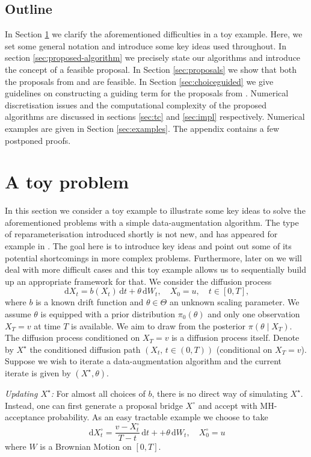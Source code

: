 \documentclass[preprint]{imsart}
\renewcommand{\th}{\theta}
\theoremstyle{definition}
\newcommand{\dd}{{\,\mathrm d}}
\begin{document}
\subsection{Outline}
In Section \ref{sec:toyproblem} we clarify the aforementioned difficulties in a toy example. Here, we set some general notation and  introduce some key ideas used throughout. In  section \ref{sec:proposed-algorithm}  we precisely state our algorithms and introduce the concept of a feasible proposal. 
 In Section \ref{sec:proposals} we show that both the proposals from \cite{DelyonHu} and \cite{Schauer} are feasible.   In Section \ref{sec:choiceguided} we give guidelines on constructing a guiding term  for the proposals from \cite{Schauer}. Numerical discretisation issues and  the computational complexity of the proposed algorithms are discussed in sections \ref{sec:tc} and  \ref{sec:impl} respectively. 
 Numerical examples are given in  Section \ref{sec:examples}. The appendix contains  a few postponed proofs.



\section{A toy problem}\label{sec:toyproblem} 
In this section we consider a toy example to illustrate some key ideas to solve the aforementioned problems with a simple data-augmentation algorithm. The type of reparameterisation introduced shortly is not new, and has appeared for example in \cite{RobertsStramer}.  The goal here is to introduce key ideas and point out some of its potential shortcomings in more complex problems. Furthermore, later on we will deal with more difficult cases and this toy example  allows us to sequentially build up an appropriate framework for that.
We consider the diffusion process  
\[\dd X_t = b(X_t) \dd t + \th\dd W_t, \quad X_0=u,\quad t\in[0,T], \] where $b$ is a known drift function and $\th \in \Theta$ an unknown scaling parameter. We assume $\th$ is equipped with a prior distribution $\pi_0(\th)$ and only one observation $X_T = v$ at time $T$  is available. We aim to draw from  the posterior $\pi(\th\mid X_T)$.
 The diffusion process conditioned on $X_T = v$ is a diffusion process itself. Denote by $X^\star$ the conditioned diffusion path $(X_t,\, t\in (0,T))$ (conditional on $X_T=v$). Suppose we wish to iterate a data-augmentation algorithm and the current iterate is given by $(X^\star, \th)$.

{\it Updating $X^\star$:}  
  For almost all choices of $b$, there is no direct way of simulating $X^\star$. Instead, one can first generate a proposal bridge $X^\circ$ and accept with MH-acceptance probability. As an easy tractable example we choose to take  
\begin{equation}\label{eq:Xo-example}	
	\dd X^\circ_t= \frac{v-X^\circ_t}{T-t} \dd t +  +\th \dd W_t, \quad X^\circ_0=u
\end{equation}
 where $W$ is a Brownian Motion on $[0,T]$.
\end{document}

